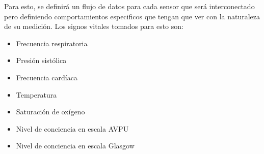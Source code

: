 Para esto, se definirá un flujo de datos para cada sensor que será interconectado pero definiendo comportamientos especificos que tengan que ver con la naturaleza de su medición.
Los signos vitales tomados para esto son: 

\begin{itemize}
    \item Frecuencia respiratoria
    \item Presión sistólica
    \item Frecuencia cardíaca
    \item Temperatura
    \item Saturación de oxígeno
    \item Nivel de conciencia en escala AVPU
    \item Nivel de conciencia en escala Glasgow
\end{itemize}